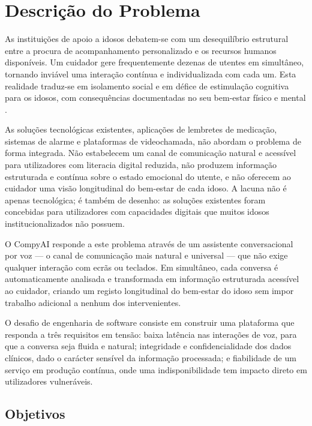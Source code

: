 \section{Descrição do Problema}
\label{sec:problema}

As instituições de apoio a idosos debatem-se com um desequilíbrio estrutural entre a procura
de acompanhamento personalizado e os recursos humanos disponíveis. Um cuidador gere
frequentemente dezenas de utentes em simultâneo, tornando inviável uma interação contínua e
individualizada com cada um. Esta realidade traduz-se em isolamento social e em défice de
estimulação cognitiva para os idosos, com consequências documentadas no seu bem-estar físico
e mental \parencite{who2021ageism}.

As soluções tecnológicas existentes, aplicações de lembretes de medicação, sistemas de
alarme e plataformas de videochamada, não abordam o problema de forma integrada. Não
estabelecem um canal de comunicação natural e acessível para utilizadores com literacia
digital reduzida, não produzem informação estruturada e contínua sobre o estado emocional do
utente, e não oferecem ao cuidador uma visão longitudinal do bem-estar de cada idoso. A
lacuna não é apenas tecnológica; é também de desenho: as soluções existentes foram concebidas
para utilizadores com capacidades digitais que muitos idosos institucionalizados não possuem.

O CompyAI responde a este problema através de um assistente conversacional por voz — o canal
de comunicação mais natural e universal — que não exige qualquer interação com ecrãs ou
teclados. Em simultâneo, cada conversa é automaticamente analisada e transformada em
informação estruturada acessível ao cuidador, criando um registo longitudinal do bem-estar do
idoso sem impor trabalho adicional a nenhum dos intervenientes.

O desafio de engenharia de software consiste em construir uma plataforma que responda a três
requisitos em tensão: baixa latência nas interações de voz, para que a conversa seja fluida e
natural; integridade e confidencialidade dos dados clínicos, dado o carácter sensível da
informação processada; e fiabilidade de um serviço em produção contínua, onde uma
indisponibilidade tem impacto direto em utilizadores vulneráveis.

\subsection{Objetivos}
\label{subsec:objetivos}

